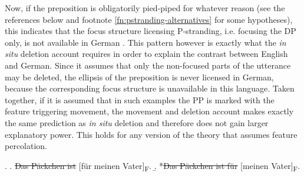 Now, if the preposition is obligatorily pied-piped for whatever reason (see the references below and footnote \ref{fn:pstranding-alternatives} for some hypotheses), this indicates that the focus structure licensing P-stranding, i.e. focusing the DP only, is not available in German \Next. This pattern however is exactly what the \textit{in situ} deletion account requires in order to explain the contrast between English and German. Since it assumes that only the non-focused parts of the utterance may be deleted, the ellipsis of the preposition is never licensed in German, because the corresponding focus structure \Next[b] is unavailable in this language. Taken together, if it is assumed that in such examples the PP is marked with the feature triggering movement, the movement and deletion account makes exactly the same prediction as \textit{in situ} deletion and therefore does not gain larger explanatory power. This holds for any version of the theory that assumes feature percolation.

\ex. \label{ex:pst-focus-german}
\a. \sout{Das Päckchen ist} [für meinen Vater]\textsubscript{F}. 
\b. *\sout{Das Päckchen ist für} [meinen Vater]\textsubscript{F}.

